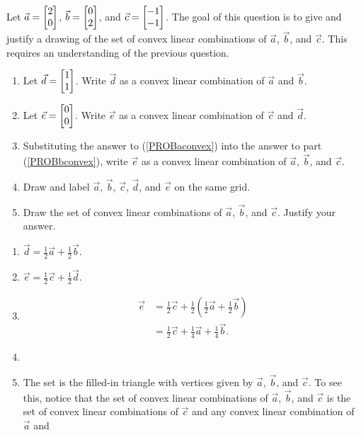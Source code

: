 \begin{exercises}
\begin{problist}
	\prob
		Let $\vec a=\mat{2 \\0}$, $\vec b=\mat{0 \\ 2}$, and $\vec c=\mat{-1 \\ -1}$. 
		The goal of this question is to give and justify a drawing of the set of 
		convex linear combinations of $\vec a$, $\vec b$, and $\vec c$. This requires an understanding of the previous question.
		\begin{enumerate}
		\item \label{PROBaconvex} Let $\vec d=\mat{1 \\ 1}$. Write $\vec d$ as a convex
			linear combination of $\vec a$ and $\vec b$.
		\item \label{PROBbconvex} Let $\vec e=\mat{0 \\ 0}$. Write $\vec e$ as a convex 
			linear combination of $\vec c$ and $\vec d$.
		\item Substituting the answer to (\ref{PROBaconvex}) into the answer to part
			(\ref{PROBbconvex}), write $\vec e$ as a convex linear combination of $\vec a$, $\vec b$, and $\vec c$.
		\item Draw and label $\vec a$, $\vec b$, $\vec c$, $\vec d$, and
			$\vec e$ on the same grid.
		\item Draw the set of convex linear combinations of $\vec a$, $\vec b$, 
			and $\vec c$. Justify your answer.
		\end{enumerate}
	\begin{solution}
		\begin{enumerate}
			\item
				$
					\vec d = \tfrac{1}{2}\vec a + \tfrac{1}{2}\vec b.
				$
				 \item
				$
					\vec e= \tfrac{1}{2}\vec c+\tfrac{1}{2}\vec d.
				$
				 \item
				\begin{align*}
					\vec e & = \tfrac{1}{2}\vec c+\tfrac{1}{2}(\tfrac{1}{2}\vec a + \tfrac{1}{2}\vec b)\\
					       & = \tfrac{1}{2}\vec c+\tfrac{1}{4}\vec a + \tfrac{1}{4}\vec b.
				\end{align*}
				\item 
				\item The set is the filled-in
				triangle with vertices given by $\vec a$,
				$\vec b$, and $\vec c$. To see this, notice
				that the set of convex linear combinations of
				$\vec a$, $\vec b$, and $\vec c$ is the set of
				convex linear combinations of $\vec c$ and any
				convex linear combination of $\vec a$ and

\end{enumerate}
\end{solution}
\end{problist}
\end{exercises}
